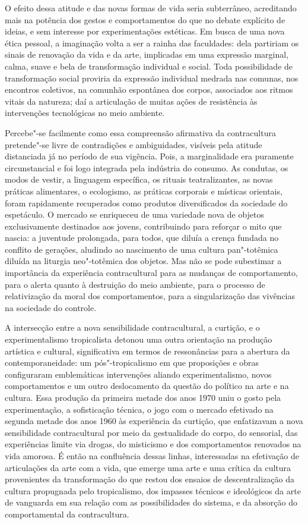 O efeito dessa atitude e das novas formas de vida seria subterrâneo,
acreditando mais na potência dos gestos e comportamentos do que no debate
explícito de ideias, e  sem interesse por experimentações estéticas. Em
busca de uma nova ética pessoal, a imaginação volta a ser a rainha das
faculdades: dela partiriam os sinais de renovação da vida e da arte,
implicadas em uma expressão marginal, calma, suave e bela de
transformação individual e social. Toda possibilidade de transformação
social proviria da expressão individual medrada nas comunas, nos
encontros coletivos, na comunhão espontânea dos corpos, associados
aos ritmos vitais da natureza; daí a articulação de muitas ações de
resistência às intervenções tecnológicas no meio ambiente.

Percebe"-se facilmente como essa compreensão afirmativa da contracultura
pretende"-se livre de contradições e ambiguidades, visíveis pela atitude
distanciada já no período de sua vigência. Pois, a marginalidade era
puramente circunstancial e foi logo integrada pela indústria do consumo.
As condutas, os modos de vestir, a linguagem específica, os rituais
teatralizantes, as novas práticas alimentares, o ecologismo, as práticas
corporais e místicas orientais, foram rapidamente recuperados como
produtos diversificados da sociedade do espetáculo. O mercado se
enriqueceu de uma variedade nova de objetos exclusivamente destinados
aos jovens, contribuindo para reforçar o mito que nascia: a juventude
prolongada, para todos, que diluía a crença fundada no conflito de
gerações, aludindo ao nascimento de uma cultura pan"-totêmica diluída na
liturgia neo"-totêmica dos objetos. Mas não se pode subestimar a
importância da experiência contracultural para as mudanças de
comportamento, para o alerta quanto à destruição do meio ambiente, para
o processo de relativização da moral dos comportamentos, para a
singularização das vivências na sociedade do controle.

\asterisc

A intersecção entre a nova sensibilidade contracultural, a curtição, e o
experimentalismo tropicalista detonou uma outra orientação na produção
artística e cultural, significativa em termos de ressonâncias para a
abertura da contemporaneidade: um pós"-tropicalismo em que proposições e
obras configuraram emblemáticas intervenções aliando
experimentalismo, novos comportamentos e um outro deslocamento da
questão do político na arte e na cultura. Essa produção da primeira
metade dos anos 1970 uniu o gosto pela experimentação, a sofisticação
técnica, o jogo com o mercado efetivado na segunda metade dos anos 1960
às experiência da curtição, que enfatizavam a nova sensibilidade contracultural por meio da
gestualidade do corpo, do sensorial, das experiências limite via drogas,
do misticismo e dos comportamentos renovados na vida amorosa. É então na
confluência dessas linhas, interessadas na efetivação de articulações da
arte com a vida, que emerge uma arte e uma crítica da cultura
provenientes da transformação do que restou dos ensaios de
descentralização da cultura propugnada pelo tropicalismo, dos impasses
técnicos e ideológicos da arte de vanguarda em sua relação com as
possibilidades do sistema, e da absorção do comportamental da
contracultura.

